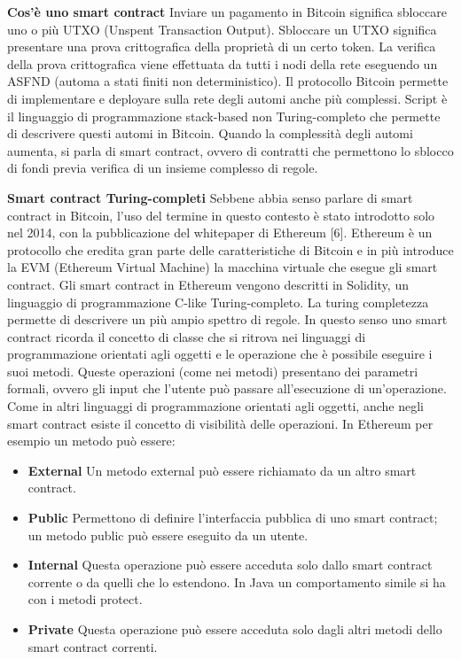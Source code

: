\documentclass[12pt,italian,]{book}
\providecommand{\tightlist}{%
  \setlength{\itemsep}{0pt}\setlength{\parskip}{0pt}}
\begin{document}
\textbf{\textbf{Cos'è uno smart contract}} Inviare un pagamento in Bitcoin significa sbloccare uno o più UTXO (Unspent Transaction Output). Sbloccare un UTXO significa presentare una prova crittografica della proprietà di un certo token. La verifica della prova crittografica viene effettuata da tutti i nodi della rete eseguendo un ASFND (automa a stati finiti non deterministico). Il protocollo Bitcoin permette di implementare e deployare sulla rete degli automi anche più complessi. Script è il linguaggio di programmazione stack-based non Turing-completo che permette di descrivere questi automi in Bitcoin. Quando la complessità degli automi aumenta, si parla di smart contract, ovvero di contratti che permettono lo sblocco di fondi previa verifica di un insieme complesso di regole.

\textbf{\textbf{Smart contract Turing-completi}} Sebbene abbia senso parlare di smart contract in Bitcoin, l'uso del termine in questo contesto è stato introdotto solo nel 2014, con la pubblicazione del whitepaper di Ethereum {[}6{]}. Ethereum è un protocollo che eredita gran parte delle caratteristiche di Bitcoin e in più introduce la EVM (Ethereum Virtual Machine) la macchina virtuale che esegue gli smart contract. Gli smart contract in Ethereum vengono descritti in Solidity, un linguaggio di programmazione C-like Turing-completo. La turing completezza permette di descrivere un più ampio spettro di regole. In questo senso uno smart contract ricorda il concetto di classe che si ritrova nei linguaggi di programmazione orientati agli oggetti e le operazione che è possibile eseguire i suoi metodi. Queste operazioni (come nei metodi) presentano dei parametri formali, ovvero gli input che l'utente può passare all'esecuzione di un'operazione. Come in altri linguaggi di programmazione orientati agli oggetti, anche negli smart contract esiste il concetto di visibilità delle operazioni. In Ethereum per esempio un metodo può essere:

\begin{itemize}
\tightlist
\item
  \textbf{\textbf{External}} Un metodo external può essere richiamato da un altro smart contract.
\item
  \textbf{\textbf{Public}} Permettono di definire l'interfaccia pubblica di uno smart contract; un metodo public può essere eseguito da un utente.
\item
  \textbf{\textbf{Internal}} Questa operazione può essere acceduta solo dallo smart contract corrente o da quelli che lo estendono. In Java un comportamento simile si ha con i metodi protect.
\item
  \textbf{\textbf{Private}} Questa operazione può essere acceduta solo dagli altri metodi dello smart contract correnti.
\end{itemize}
\end{document}
